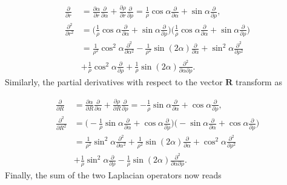 \documentclass{article}
\numberwithin{equation}{section}
\numberwithin{figure}{section}
\begin{document}
\begin{subequations}
\begin{align}
        \frac{\partial}{\partial r}        &= \frac{\partial\alpha}{\partial r} \frac{\partial}{\partial\alpha} +  \frac{\partial\rho}{\partial r} \frac{\partial}{\partial\rho} = \frac{1}{\rho}\cos{\alpha}\frac{\partial}{\partial \alpha} + \sin{\alpha}\frac{\partial}{\partial \rho}, \\
        \frac{\partial^2}{\partial r^2} &= \bigg( \frac{1}{\rho} \cos\alpha \frac{\partial}{\partial\alpha} + \sin\alpha \frac{\partial}{\partial\rho}\bigg) \bigg( \frac{1}{\rho} \cos\alpha \frac{\partial}{\partial\alpha} + \sin\alpha \frac{\partial}{\partial\rho}\bigg) \nonumber \\
                                                     &= \frac{1}{\rho^2} \cos^2\alpha \frac{\partial^2}{\partial\alpha^{2}} - \frac{1}{\rho^2} \sin(2\alpha) \frac{\partial}{\partial\alpha} + \sin^2\alpha \frac{\partial^2}{\partial\rho^{2}} \nonumber \\
                                                     &+ \frac{1}{\rho} \cos^2\alpha \frac{\partial}{\partial\rho} + \frac{1}{\rho} \sin(2\alpha) \frac{\partial^2}{\partial\alpha \partial\rho}.
\end{align}
\end{subequations}
Similarly, the partial derivatives with respect to the vector $\mathbf{R}$ transform as

\begin{subequations}
\begin{align}
        \frac{\partial}{\partial R}        &= \frac{\partial\alpha}{\partial R} \frac{\partial}{\partial\alpha} +  \frac{\partial\rho}{\partial R} \frac{\partial}{\partial\rho} = -\frac{1}{\rho}\sin{\alpha}\frac{\partial}{\partial \alpha} + \cos{\alpha}\frac{\partial}{\partial \rho},  \\
        \frac{\partial^2}{\partial R^2}&= \bigg( -\frac{1}{\rho} \sin\alpha \frac{\partial}{\partial\alpha} + \cos\alpha \frac{\partial}{\partial\rho}\bigg)  \bigg( -  \sin\alpha \frac{\partial}{\partial\alpha} + \cos\alpha \frac{\partial}{\partial\rho}\bigg) \nonumber \\
                                                    &= \frac{1}{\rho^2} \sin^2\alpha\frac{\partial^2}{\partial\alpha^{2}} + \frac{1}{\rho^2} \sin(2\alpha)\frac{\partial}{\partial\alpha} + \cos^2\alpha \frac{\partial^2}{\partial \rho^2} \nonumber \\
                                                    &+\frac{1}{\rho}\sin^2\alpha\frac{\partial}{\partial \rho}- \frac{1}{\rho} \sin(2\alpha) \frac{\partial^2}{\partial\alpha \partial\rho}.
\end{align}
\end{subequations}
Finally, the sum of the two Laplacian operators now reads 
\end{document}
